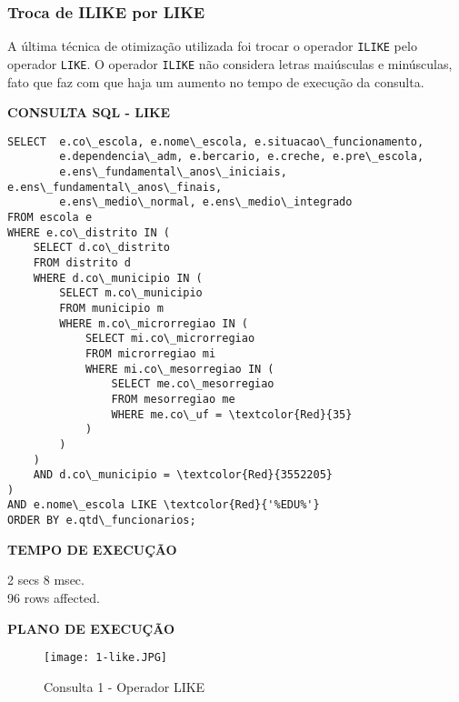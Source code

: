 \documentclass[12pt,a4paper]{article}
\begin{document}
\subsubsection{Troca de ILIKE por LIKE}

A última técnica de  otimização utilizada foi trocar o operador \texttt{ILIKE} pelo operador \texttt{LIKE}. O operador \texttt{ILIKE} não considera letras maiúsculas e minúsculas, fato que faz com que haja um aumento no tempo de execução da consulta. 

\vspace{0.5cm}
\begin{flushleft}
\textbf{CONSULTA SQL - LIKE}\\
\end{flushleft}

\begin{Verbatim}[commandchars=\\\{\}]
SELECT  e.co\_escola, e.nome\_escola, e.situacao\_funcionamento, 
        e.dependencia\_adm, e.bercario, e.creche, e.pre\_escola,
        e.ens\_fundamental\_anos\_iniciais, e.ens\_fundamental\_anos\_finais,
        e.ens\_medio\_normal, e.ens\_medio\_integrado
FROM escola e
WHERE e.co\_distrito IN (
    SELECT d.co\_distrito
    FROM distrito d
    WHERE d.co\_municipio IN (
        SELECT m.co\_municipio
        FROM municipio m
        WHERE m.co\_microrregiao IN (
            SELECT mi.co\_microrregiao
            FROM microrregiao mi
            WHERE mi.co\_mesorregiao IN (
                SELECT me.co\_mesorregiao
                FROM mesorregiao me
                WHERE me.co\_uf = \textcolor{Red}{35}
            )
        )
    )
    AND d.co\_municipio = \textcolor{Red}{3552205}
)
AND e.nome\_escola LIKE \textcolor{Red}{'%EDU%'}
ORDER BY e.qtd\_funcionarios;
\end{Verbatim}

\begin{flushleft}
\textbf{TEMPO DE EXECUÇÃO}\\
\end{flushleft}
2 secs 8 msec.\\
96 rows affected.\\




\begin{flushleft}
\textbf{PLANO DE EXECUÇÃO}\\
\end{flushleft}

\begin{figure}[H]
    \centering
    \texttt{[image: 1-like.JPG]}
    \caption{Consulta 1 - Operador LIKE}
    \label{fig:diagrama}
\end{figure}
\end{document}
